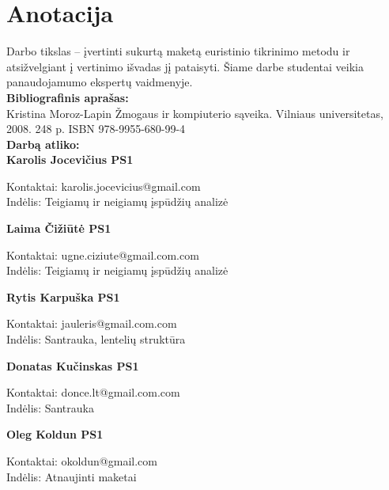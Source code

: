 

\newcommand{\anotacijaIndelis}[3]{
	\textbf{#1}
	\begin{flushleft}
	\hspace*{1cm}
	Kontaktai: #2
	\\
	\hspace*{1cm}
	Indėlis: #3
	\end{flushleft}
}

\newcommand{\anotacija}[2]{
	\textbf{#1}
	\begin{flushleft}
	\hspace*{1cm}
	Kontaktai: #2
	\end{flushleft}
}

\section*{Anotacija}

		Darbo tikslas – įvertinti sukurtą maketą euristinio tikrinimo metodu ir atsižvelgiant į vertinimo išvadas jį pataisyti. 
		Šiame darbe studentai veikia panaudojamumo ekspertų vaidmenyje. \\
		
		\textbf{Bibliografinis aprašas:}\\
		Kristina Moroz-Lapin Žmogaus ir kompiuterio sąveika. Vilniaus universitetas, 2008. 248 p. ISBN 978-9955-680-99-4
		\\
		
		\textbf{Darbą atliko:}\\

		\anotacijaIndelis{Karolis Jocevičius PS1}{karolis.jocevicius@gmail.com}{Teigiamų ir neigiamų įspūdžių analizė}
		
		\anotacijaIndelis{Laima Čižiūtė PS1}{ugne.ciziute@gmail.com.com}{Teigiamų ir neigiamų įspūdžių analizė}
		
		\anotacijaIndelis{Rytis Karpuška PS1}{jauleris@gmail.com.com}{Santrauka, lentelių struktūra}

		\anotacijaIndelis{Donatas Kučinskas PS1}{donce.lt@gmail.com.com}{Santrauka}

		\anotacijaIndelis{Oleg Koldun PS1}{okoldun@gmail.com}{Atnaujinti maketai}